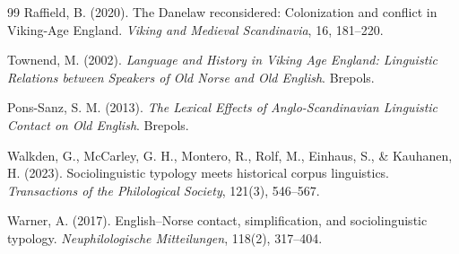 \documentclass[11pt]{article}
\begin{document}
\begin{thebibliography}{99}
Raffield, B. (2020). The Danelaw reconsidered: Colonization and conflict in Viking-Age England. \textit{Viking and Medieval Scandinavia}, 16, 181--220.

Townend, M. (2002). \textit{Language and History in Viking Age England: Linguistic Relations between Speakers of Old Norse and Old English}. Brepols.

Pons-Sanz, S. M. (2013). \textit{The Lexical Effects of Anglo-Scandinavian Linguistic Contact on Old English}. Brepols.

Walkden, G., McCarley, G. H., Montero, R., Rolf, M., Einhaus, S., \& Kauhanen, H. (2023). Sociolinguistic typology meets historical corpus linguistics. \textit{Transactions of the Philological Society}, 121(3), 546--567.

Warner, A. (2017). English--Norse contact, simplification, and sociolinguistic typology. \textit{Neuphilologische Mitteilungen}, 118(2), 317--404.

\end{thebibliography}
\end{document}
